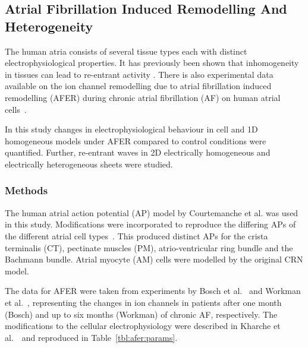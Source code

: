 \subsection{Atrial Fibrillation Induced Remodelling And Heterogeneity}

The human atria consists of several tissue types each with distinct
electrophysiological properties.  It has previously been shown that
inhomogeneity in tissues can lead to re-entrant activity
\cite{Bernus2005, Coronel1992, Kumagai1997}.  There is also experimental
data available on the ion channel remodelling due to atrial
fibrillation induced remodelling (AFER) during chronic atrial
fibrillation (AF) on human atrial cells~\cite{Bosch1999,Workman2001}.

In this study changes in electrophysiological
behaviour in cell and 1D homogeneous models under AFER compared to control
conditions were quantified.
Further, re-entrant waves in 2D electrically homogeneous
and electrically heterogeneous sheets were studied.

\subsubsection{Methods}

The human atrial action potential (AP) model by Courtemanche et
al.\cite{CRN98} was used in this study.  Modifications were
incorporated to reproduce the differing APs of the different atrial cell
types~\cite{Seemann2006}.  This produced distinct APs for the
crista terminalis (CT), pectinate muscles (PM), atrio-ventricular ring
bundle and the Bachmann bundle.  Atrial myocyte (AM) cells were modelled
by the original CRN model.

The data for AFER were taken from experiments by Bosch et
al.~\cite{Bosch1999} and Workman et al.~\cite{Workman2001}, representing
the changes in ion channels in patients after one month (Bosch)
and up to six months (Workman) of chronic AF, respectively.  The
modifications to the cellular electrophysiology were described in
Kharche et al.~\cite{Kharche2007}\ and reproduced in Table~\ref{tbl:afer:params}.


